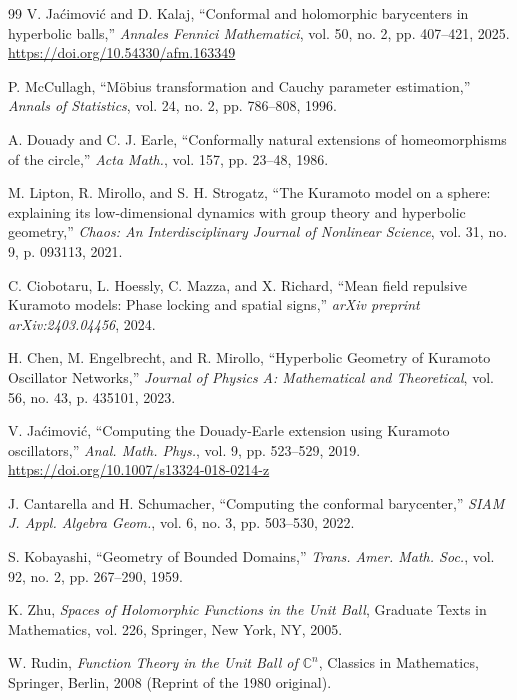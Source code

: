 \documentclass{article}
\theoremstyle{plain}%
\theoremstyle{definition}
\theoremstyle{remark}
\theoremstyle{prop}
\begin{document}
\begin{thebibliography}{99}
V. Jaćimović and D. Kalaj, ``Conformal and holomorphic barycenters in hyperbolic balls,'' \emph{Annales Fennici Mathematici}, vol. 50, no. 2, pp. 407--421, 2025. \url{https://doi.org/10.54330/afm.163349}

P. McCullagh, ``Möbius transformation and Cauchy parameter estimation,'' \emph{Annals of Statistics}, vol. 24, no. 2, pp. 786--808, 1996.

A. Douady and C. J. Earle, ``Conformally natural extensions of homeomorphisms of the circle,'' \emph{Acta Math.}, vol. 157, pp. 23--48, 1986.

M. Lipton, R. Mirollo, and S. H. Strogatz, ``The Kuramoto model on a sphere: explaining its low-dimensional dynamics with group theory and hyperbolic geometry,'' \emph{Chaos: An Interdisciplinary Journal of Nonlinear Science}, vol. 31, no. 9, p. 093113, 2021.

C. Ciobotaru, L. Hoessly, C. Mazza, and X. Richard, ``Mean field repulsive Kuramoto models: Phase locking and spatial signs,'' \emph{arXiv preprint arXiv:2403.04456}, 2024.

H. Chen, M. Engelbrecht, and R. Mirollo, ``Hyperbolic Geometry of Kuramoto Oscillator Networks,'' \emph{Journal of Physics A: Mathematical and Theoretical}, vol. 56, no. 43, p. 435101, 2023.

V. Jaćimović, ``Computing the Douady-Earle extension using Kuramoto oscillators,'' \emph{Anal. Math. Phys.}, vol. 9, pp. 523--529, 2019. \url{https://doi.org/10.1007/s13324-018-0214-z}

J. Cantarella and H. Schumacher, ``Computing the conformal barycenter,'' \emph{SIAM J. Appl. Algebra Geom.}, vol. 6, no. 3, pp. 503--530, 2022.







S. Kobayashi, ``Geometry of Bounded Domains,'' \emph{Trans. Amer. Math. Soc.}, vol. 92, no. 2, pp. 267--290, 1959.

K. Zhu, \emph{Spaces of Holomorphic Functions in the Unit Ball}, Graduate Texts in Mathematics, vol. 226, Springer, New York, NY, 2005.



W. Rudin, \emph{Function Theory in the Unit Ball of $\mathbb{C}^n$}, Classics in Mathematics, Springer, Berlin, 2008 (Reprint of the 1980 original).


\end{thebibliography}
\end{document}
